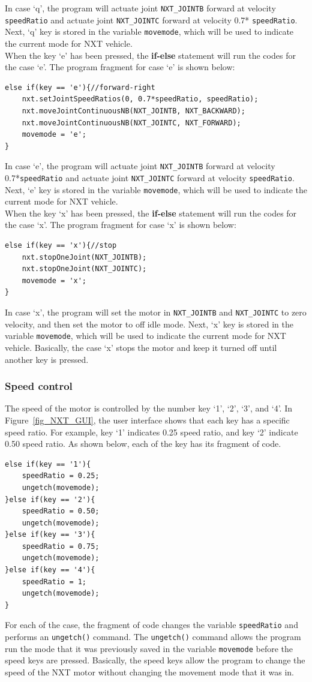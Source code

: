 \documentclass[11pt]{article}
\begin{document}
In case `q', the program will actuate joint {\tt NXT\_JOINTB} forward at velocity 
{\tt speedRatio} and actuate joint {\tt NXT\_JOINTC} forward at velocity 0.7*
{\tt speedRatio}. Next, `q' key is stored in the variable {\tt movemode}, which 
will be used to indicate the current mode for NXT vehicle.\\ 
When the key `e' has been pressed, the {\bf if-else} statement will run 
the codes for the case `e'. The program fragment for case `e' is shown below:
\begin{lstlisting}
else if(key == 'e'){//forward-right
    nxt.setJointSpeedRatios(0, 0.7*speedRatio, speedRatio);
    nxt.moveJointContinuousNB(NXT_JOINTB, NXT_BACKWARD);
    nxt.moveJointContinuousNB(NXT_JOINTC, NXT_FORWARD);
    movemode = 'e';
}
\end{lstlisting}
In case `e', the program will actuate joint {\tt NXT\_JOINTB} forward at velocity 
0.7*{\tt speedRatio} and actuate joint {\tt NXT\_JOINTC} forward at velocity 
{\tt speedRatio}. Next, `e' key is stored in the variable {\tt movemode}, which 
will be used to indicate the current mode for NXT vehicle.\\ 
When the key `x' has been pressed, the {\bf if-else} statement will run 
the codes for the case `x'. The program fragment for case `x' is shown below:
\begin{lstlisting}
else if(key == 'x'){//stop
    nxt.stopOneJoint(NXT_JOINTB);
    nxt.stopOneJoint(NXT_JOINTC);
    movemode = 'x';
}
\end{lstlisting}
In case `x', the program will set the motor in {\tt NXT\_JOINTB} and 
{\tt NXT\_JOINTC} to zero velocity, and then set the motor to off idle mode. 
Next, `x' key is stored in the variable {\tt movemode}, which will be used to 
indicate the current mode for NXT vehicle. Basically, the case `x' stops the 
motor and keep it turned off until another key is pressed.

\subsubsection*{Speed control}
The speed of the motor is controlled by the number key `1', `2', `3', and `4'.
In Figure~\ref{fig_NXT_GUI}, the user interface shows that each key has a 
specific speed ratio. For example, key `1' indicates 0.25 speed ratio, and key 
`2' indicate 0.50 speed ratio. As shown below, each of the key has its fragment 
of code.
\begin{lstlisting}
else if(key == '1'){
    speedRatio = 0.25;
    ungetch(movemode);
}else if(key == '2'){
    speedRatio = 0.50;
    ungetch(movemode);
}else if(key == '3'){
    speedRatio = 0.75;
    ungetch(movemode);
}else if(key == '4'){
    speedRatio = 1;
    ungetch(movemode);
}
\end{lstlisting}
For each of the case, the fragment of code changes the variable {\tt speedRatio} 
and performs an {\tt ungetch()} command. The {\tt ungetch()} command allows the 
program run the mode that it was previously saved in the variable {\tt movemode}
before the speed keys are pressed. Basically, the speed keys allow the program 
to change the speed of the NXT motor without changing the movement mode that it 
was in.
\end{document}
